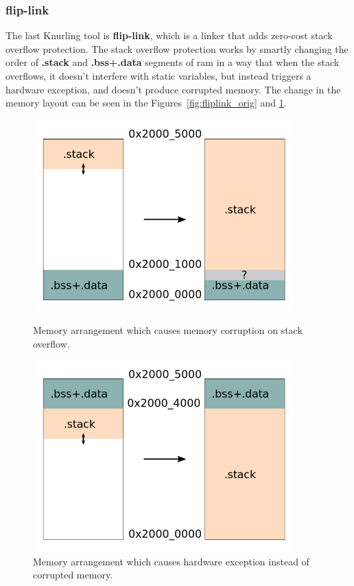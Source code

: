 \subsubsection{flip-link}
The last Knurling tool is \textbf{flip-link}, which is a linker that adds zero-cost stack overflow protection\cite{knurling_project_knurling-rsflip-link_2021}.
The stack overflow protection works by smartly changing the order of \textbf{.stack} and \textbf{.bss+.data} segments of \acs{ram} in a way that when the stack overflows, it doesn't interfere with static variables, but instead triggers a hardware exception, and doesn't produce corrupted memory.
The change in the memory layout can be seen in the Figures~\ref{fig:fliplink_orig} and \ref{fig:fliplink_changed}.
\begin{figure}[H]
    \begin{minipage}[t]{0.45\textwidth}
        \centering
        \includegraphics[width=0.9\textwidth]{obrazky/flip_overflow}
        \caption{Memory arrangement which causes memory corruption on stack overflow\cite{knurling_project_knurling-rsflip-link_2021}.}
        \label{fig:fliplink_orig}
    \end{minipage}\hfill
    \begin{minipage}[t]{0.45\textwidth}
        \centering
        \includegraphics[width=0.9\textwidth]{obrazky/flip_flipped}
        \caption{Memory arrangement which causes hardware exception instead of corrupted memory\cite{knurling_project_knurling-rsflip-link_2021}.}
        \label{fig:fliplink_changed}
    \end{minipage}
\end{figure}

